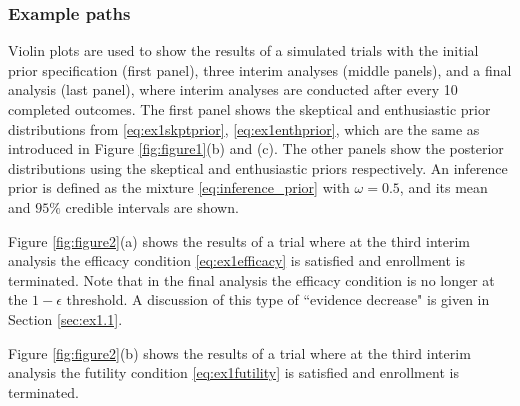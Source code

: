 \documentclass[12pt]{article}
\begin{document}
\subsubsection{Example paths}
Violin plots are used to show the results of a simulated trials with the initial prior specification (first panel), three interim analyses (middle panels), and a final analysis (last panel), where interim analyses are conducted after every 10 completed outcomes. The first panel shows the skeptical and enthusiastic prior distributions from \eqref{eq:ex1skptprior}, \eqref{eq:ex1enthprior}, which are the same as introduced in Figure \ref{fig:figure1}(b) and (c). The other panels show the posterior distributions using the skeptical and enthusiastic priors respectively. An inference prior is defined as the mixture \eqref{eq:inference_prior} with $\omega=0.5$, and its mean and $95\%$ credible intervals are shown.

Figure \ref{fig:figure2}(a) shows the results of a trial where at the third interim analysis the efficacy condition \eqref{eq:ex1efficacy} is satisfied and enrollment is terminated. Note that in the final analysis the efficacy condition is no longer at the $1-\epsilon$ threshold. A discussion of this type of ``evidence decrease" is given in Section \ref{sec:ex1.1}.

Figure \ref{fig:figure2}(b) shows the results of a trial where at the third interim analysis the futility condition \eqref{eq:ex1futility} is satisfied and enrollment is terminated. 
\end{document}
